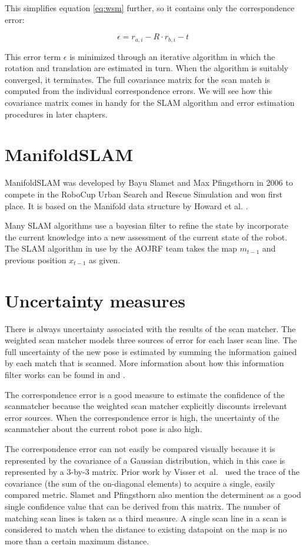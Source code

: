This simplifies equation \ref{eq:wsm} further, so it contains only the correspondence error:

\begin{equation}
\epsilon = r_{a, i} - R \cdot r_{b, i} - t
\end{equation}

This error term $\epsilon$ is minimized through an iterative algorithm in which the rotation and translation are estimated in turn. When the algorithm is suitably converged, it terminates. The full covariance matrix for the scan match is computed from the individual correspondence errors. We will see how this covariance matrix comes in handy for the SLAM algorithm and error estimation procedures in later chapters.

\section{ManifoldSLAM}
ManifoldSLAM was developed by Bayu Slamet and Max Pfingsthorn in 2006 \cite{slamet2006manifoldslam} to compete in the RoboCup Urban Search and Rescue Simulation and won first place. It is based on the Manifold data structure by Howard et al. \cite{howard2006multirobot}. 

Many SLAM algorithms use a bayesian filter to refine the state by incorporate the current knowledge into a new assessment of the current state of the robot. The SLAM algorithm in use by the AOJRF team takes the map $m_{t-1}$ and previous position $x_{t-1}$ as given. 


\section{Uncertainty measures}
\label{uncertainty}
There is always uncertainty associated with the results of the scan matcher. The weighted scan matcher models three sources of error for each laser scan line. The full uncertainty of the new pose is estimated by summing the information gained by each match that is scanned. More information about how this information filter works can be found in \cite[p.71]{thrun2002probabilistic} and \cite[p.72]{slamet2006manifoldslam}.

The correspondence error is a good measure to estimate the confidence of the scanmatcher because the weighted scan matcher explicitly discounts irrelevant error sources. When the correspondence error is high, the uncertainty of the scanmatcher about the current robot pose is also high.

The correspondence error can not easily be compared visually because it is represented by the covariance of a Gaussian distribution, which in this case is represented by a 3-by-3 matrix. Prior work by Visser et~al.\ \cite{visser2009robust} used the trace of the covariance (the sum of the on-diagonal elements) to acquire a single, easily compared metric. Slamet and Pfingsthorn \cite[p. 61]{slamet2006manifoldslam} also mention the determinent as a good single confidence value that can be derived from this matrix. The number of matching scan lines is taken as a third measure. A single scan line in a scan is considered to match when the distance to existing datapoint on the map is no more than a certain maximum distance.